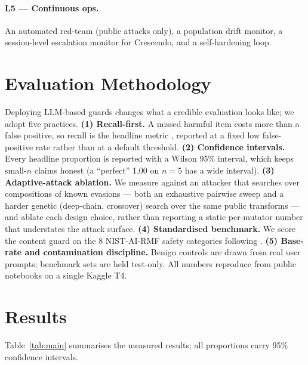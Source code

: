 \documentclass[11pt]{article}
\begin{document}
\paragraph{L5 --- Continuous ops.} An automated red-team (public attacks only), a population drift
monitor, a session-level escalation monitor for Crescendo, and a self-hardening loop.

\section{Evaluation Methodology}
Deploying LLM-based guards changes what a credible evaluation looks like; we adopt five practices.
\textbf{(1) Recall-first.} A missed harmful item costs more than a false positive, so recall is the
headline metric \citep{guard-bench}, reported at a fixed low false-positive rate rather than at a
default threshold. \textbf{(2) Confidence intervals.} Every headline proportion is reported with a
Wilson 95\% interval, which keeps small-$n$ claims honest (a ``perfect'' 1.00 on $n{=}5$ has a wide
interval). \textbf{(3) Adaptive-attack ablation.} We measure against an attacker that searches over
compositions of known evasions --- both an exhaustive pairwise sweep and a harder genetic
(deep-chain, crossover) search over the same public transforms --- and ablate each design choice,
rather than reporting a static per-mutator number that understates the attack surface. \textbf{(4) Standardised benchmark.} We score
the content guard on the 8 NIST-AI-RMF safety categories following \citet{guard-bench}.
\textbf{(5) Base-rate and contamination discipline.} Benign controls are drawn from real user
prompts; benchmark sets are held test-only. All numbers reproduce from public notebooks on a single
Kaggle T4.

\section{Results}
Table~\ref{tab:main} summarises the measured results; all proportions carry 95\% confidence intervals.
\end{document}
